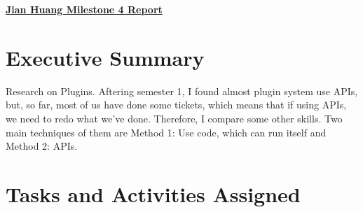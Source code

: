 \begin{center}
{\textbf{\underline{{Jian Huang Milestone 4 Report}}}}
\end{center}

\section*{Executive Summary}

Research on Plugins. Aftering semester 1, I found almost plugin system use APIs, but, so far, most of us have done some tickets, which means that if using APIs, we need to redo what we've done. Therefore, I compare some other skills. Two main techniques of them are Method 1: Use code, which can run itself and Method 2: APIs.

\section*{Tasks and Activities Assigned}

